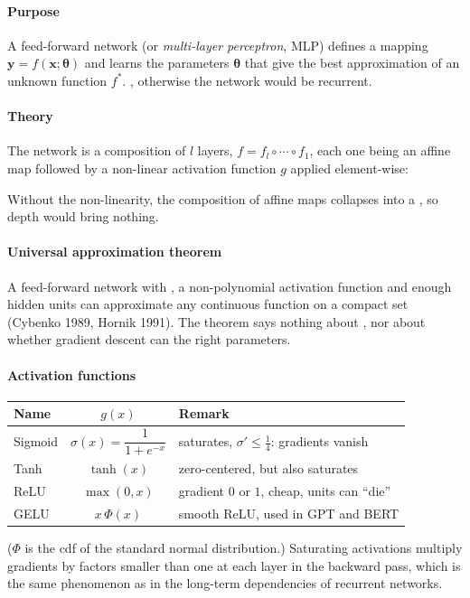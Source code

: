 \paragraph{Purpose}
A feed-forward network (or \emph{multi-layer perceptron}, MLP) defines a mapping
$\bm{y} = f(\bm{x};\bm{\theta})$ and learns the parameters $\bm{\theta}$ that give the best
approximation of an unknown function $f^{*}$. , otherwise the network would be recurrent.

\paragraph{Theory}
The network is a composition of $l$ layers, $f = f_{l}\circ\cdots\circ f_{1}$, each one
being an affine map followed by a non-linear activation function $g$ applied element-wise:
\begin{center}
\end{center}
Without the non-linearity, the composition of affine maps collapses into a , so depth would bring nothing.

\paragraph{Universal approximation theorem}
A feed-forward network with , a non-polynomial activation function and
enough hidden units can approximate any continuous function on a compact set
(Cybenko 1989, Hornik 1991). The theorem says nothing about , nor about whether gradient descent can  the right parameters.

\paragraph{Activation functions}
\begin{center}
\begin{tabular}{|l|c|l|}
    \hline
    Name & $g(x)$ & Remark\\
    \hline
    Sigmoid & $\sigma(x) = \dfrac{1}{1+e^{-x}}$ & saturates, $\sigma'\leq\frac{1}{4}$: gradients vanish\\
    Tanh & $\tanh(x)$ & zero-centered, but also saturates\\
    ReLU & $\max(0, x)$ & gradient $0$ or $1$, cheap, units can ``die''\\
    GELU & $x\,\Phi(x)$ & smooth ReLU, used in GPT and BERT\\
    \hline
\end{tabular}
\end{center}
($\Phi$ is the cdf of the standard normal distribution.) Saturating activations multiply
gradients by factors smaller than one at each layer in the backward pass, which is the same
phenomenon as in the long-term dependencies of recurrent networks.


